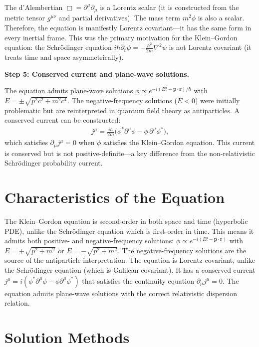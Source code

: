 The d'Alembertian $\Box = \partial^\mu\partial_\mu$ is a Lorentz scalar (it is constructed from the metric tensor $g^{\mu\nu}$ and partial derivatives). The mass term $m^2\phi$ is also a scalar. Therefore, the equation is manifestly Lorentz covariant---it has the same form in every inertial frame. This was the primary motivation for the Klein--Gordon equation: the Schr\"odinger equation $i\hbar\partial_t\psi = -\frac{\hbar^2}{2m}\nabla^2\psi$ is not Lorentz covariant (it treats time and space asymmetrically).

\textbf{Step 5: Conserved current and plane-wave solutions.}

The equation admits plane-wave solutions $\phi \propto e^{-i(Et - \mathbf{p}\cdot\mathbf{r})/\hbar}$ with $E = \pm\sqrt{p^2c^2 + m^2c^4}$. The negative-frequency solutions ($E < 0$) were initially problematic but are reinterpreted in quantum field theory as antiparticles. A conserved current can be constructed:
\begin{align}
j^\mu = \frac{i\hbar}{2m}\bigl(\phi^*\partial^\mu\phi - \phi\,\partial^\mu\phi^*\bigr),
\end{align}
which satisfies $\partial_\mu j^\mu = 0$ when $\phi$ satisfies the Klein--Gordon equation. This current is conserved but is not positive-definite---a key difference from the non-relativistic Schr\"odinger probability current.

\section*{Characteristics of the Equation}

The Klein--Gordon equation is second-order in both space and time (hyperbolic PDE), unlike the Schr\"odinger equation which is first-order in time. This means it admits both positive- and negative-frequency solutions: $\phi \propto e^{-i(Et - \mathbf{p}\cdot\mathbf{r})}$ with $E = +\sqrt{p^2 + m^2}$ or $E = -\sqrt{p^2 + m^2}$. The negative-frequency solutions are the source of the antiparticle interpretation. The equation is Lorentz covariant, unlike the Schr\"odinger equation (which is Galilean covariant). It has a conserved current $j^\mu = i(\phi^*\partial^\mu\phi - \phi\partial^\mu\phi^*)$ that satisfies the continuity equation $\partial_\mu j^\mu = 0$. The equation admits plane-wave solutions with the correct relativistic dispersion relation.
\section*{Solution Methods}

